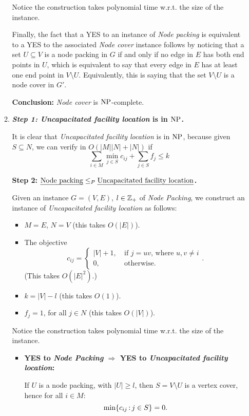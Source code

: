 \documentclass[../open-optimization/open-optimization.tex]{subfiles}
\begin{document}
\begin{enumerate}
\begin{enumerate}
	Notice the construction takes polynomial time w.r.t. the size of the instance.
	
	Finally, the fact that a YES to an instance of {\em Node packing} is equivalent to a YES to the associated {\em Node cover} instance follows by noticing that a set $U\subseteq V$ is a node packing in $G$ if and only if no edge in $E$ has both end points in $U$, which is equivalent to say that every edge in $E$ has at least one end point in $V\setminus U$. Equivalently, this is saying that the set $V\setminus U$ is a node cover in $G'$.
		
{\bf Conclusion:}	{\em Node cover} is $\text{NP}$-complete.

\item {\bf {\em Step 1: {\em Uncapacitated facility location}} is in $\text{NP}$.} 
	
	It is clear that {\em Uncapacitated facility location} is in $\text{NP}$, because given $S\subseteq N$, we can verify in $O(|M||N|+|N|)$ if
	$$\sum_{i\in M}\min_{j\in S} c_{ij} + \sum_{j\in S}f_j \leq k$$
	
 {\bf Step 2: $\text{{\em Node packing}}\leq_P\text{{\em Uncapacitated facility location}}$.} 
	
	Given an instance $G=(V,E)$, $l\in{\mathbb{Z}}_+$ of {\em Node Packing}, we construct an instance of {\em Uncapacitated facility location} as follows:
	\begin{itemize}
		\item $M=E$, $N=V$ (this takes $O(|E|)$).
		\item The objective
		$$c_{ij}=\begin{cases}|V|+1,\ & \text{if $j=uv$, where $u,v\neq i$}\\ 0,\ & \text{otherwise.}\end{cases}.$$
	  (This takes $O(|E|^2)$.) 	
		\item $k=|V|-l$ (this takes $O(1)$).
		\item $f_j=1$, for all $j\in N$ (this takes $O(|V|)$).
	\end{itemize}
	
	Notice the construction takes polynomial time w.r.t. the size of the instance.
	
\begin{itemize}
	\item {\bf YES to {\em Node Packing} $\Rightarrow$ YES to {\em Uncapacitated facility location}:}
	
	If $U$ is a node packing, with $|U|\geq l$, then $S=V\setminus U$ is a vertex cover, hence for all $i\in M$:
	$$\min\{c_{ij}{\,:\,} j\in S\}=0.$$
	

\end{itemize}
\end{enumerate}
\end{enumerate}
\end{document}
